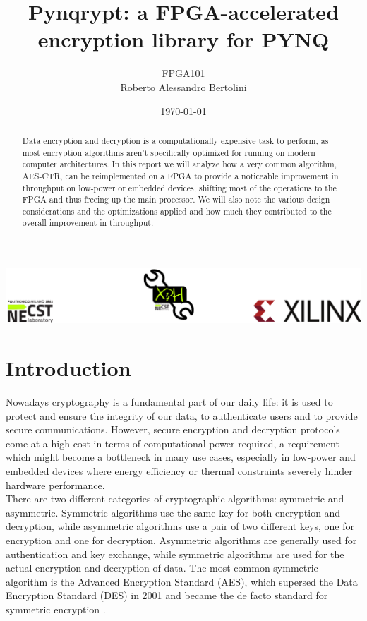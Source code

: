 \documentclass[12pt,oneside,a4paper]{article}
\title{\textbf{Pynqrypt: a FPGA-accelerated encryption library for PYNQ}}
\author{FPGA101\\Roberto Alessandro Bertolini}
\date{\today}
\begin{document}
\begin{titlepage}
	\centering
	\clearpage
	\maketitle
	\thispagestyle{empty}
	\vspace*{1cm}
	\vfill
	\centering
	\includegraphics{footer.png}
\end{titlepage}


\begin{abstract}
Data encryption and decryption is a computationally expensive task to perform, as most encryption algorithms aren't specifically optimized for running on modern computer architectures.
In this report we will analyze how a very common algorithm, AES-CTR, can be reimplemented on a FPGA to provide a noticeable improvement in throughput on low-power or embedded devices, shifting most of the operations to the FPGA and thus freeing up the main processor.
We will also note the various design considerations and the optimizations applied and how much they contributed to the overall improvement in throughput.
\end{abstract}

\section{Introduction} \label{sec:intro}
Nowadays cryptography is a fundamental part of our daily life: it is used to protect and ensure the integrity of our data, to authenticate users and to provide secure communications.
However, secure encryption and decryption protocols come at a high cost in terms of computational power required, a requirement which might become a bottleneck in many use cases, especially in low-power and embedded devices where energy efficiency or thermal constraints severely hinder hardware performance.
\\There are two different categories of cryptographic algorithms: symmetric and asymmetric.
Symmetric algorithms use the same key for both encryption and decryption, while asymmetric algorithms use a pair of two different keys, one for encryption and one for decryption.
Asymmetric algorithms are generally used for authentication and key exchange, while symmetric algorithms are used for the actual encryption and decryption of data.
The most common symmetric algorithm is the Advanced Encryption Standard (AES), which supersed the Data Encryption Standard (DES) in 2001 and became the de facto standard for symmetric encryption \cite{aes:development}.
\end{document}
